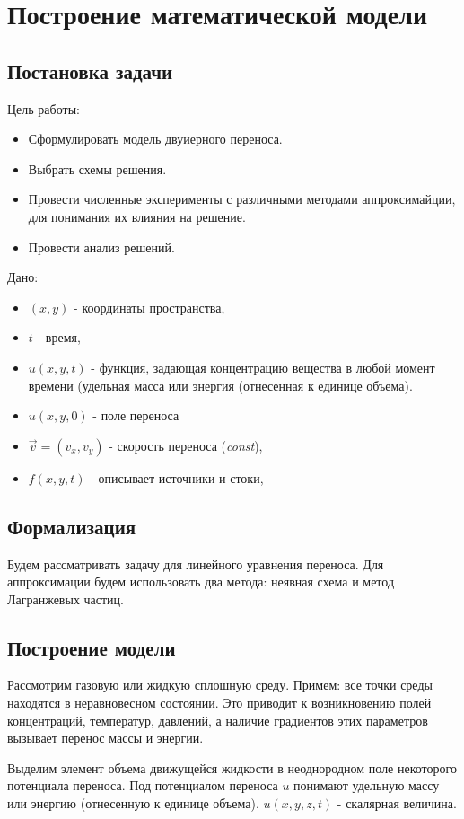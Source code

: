 \chapter{Построение математической модели}
\section{Постановка задачи}
Цель работы:
\begin{itemize}
	\item Сформулировать  модель двуиерного переноса.
	\item Выбрать схемы решения.
	\item Провести численные эксперименты с различными методами аппроксимайции, для понимания их влияния на решение.
	\item Провести анализ решений.
\end{itemize}

Дано:
\begin{itemize}

	\item ${(x,y)}$ - координаты  пространства,
	\item $t$ - время,
		\item  $u(x, y,t)$ - функция, задающая концентрацию вещества в любой момент времени (удельная масса или
		энергия (отнесенная к единице объема). 
		\item  $u(x,y,0)$ - поле переноса
	\item $\vec{v} = (v_{x}, v_{y}) $ - скорость переноса (\textit{const}),
	\item $f(x,y,t)$ - описывает источники и стоки,
\end{itemize}
\section{Формализация}
Будем рассматривать задачу для линейного уравнения переноса.
Для аппроксимации будем использовать два метода: неявная схема и метод Лагранжевых частиц.

\newpage
\section{Построение модели}
Рассмотрим газовую или жидкую сплошную среду. Примем: все точки среды
находятся в неравновесном состоянии. Это приводит к возникновению полей
концентраций, температур, давлений, а наличие градиентов этих параметров вызывает
перенос массы и энергии.

Выделим элемент объема движущейся жидкости в неоднородном поле некоторого
потенциала переноса. Под потенциалом переноса
$u$ понимают удельную массу или
энергию (отнесенную к единице объема).
$u (x, y, z, t)$ - скалярная величина.

